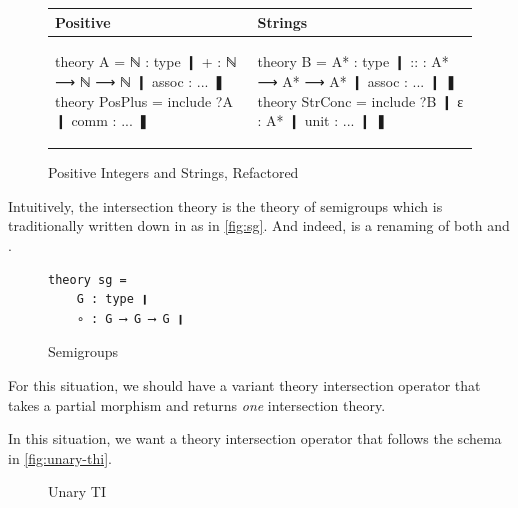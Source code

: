 \begin{figure}[ht]\centering
\begin{tabular}{|p{6cm}|p{6cm}|}\hline
  Positive& Strings \\[-2pt]\hline
\begin{mmtcode}[aboveskip=-2pt,belowskip=-2pt]
theory A =
    ℕ : type ❙
    + : ℕ ⟶ ℕ ⟶ ℕ ❙
    assoc : ... 
❚
theory PosPlus =
    include ?A ❙
    comm : ...
❚
\end{mmtcode}
& 
\begin{mmtcode}[aboveskip=-2pt,belowskip=-2pt]
theory B =
    A* : type ❙
    :: : A* ⟶ A* ⟶ A* ❙
    assoc : ... ❙
❚
theory StrConc =
    include ?B ❙
    ε : A* ❙
    unit : ... ❙
❚
\end{mmtcode}
\\[-2pt]\hline
\end{tabular}
\caption{Positive Integers and Strings, Refactored}\label{fig:posstr-intersection}\vspace*{-1.5em}
\end{figure}

Intuitively, the intersection theory is the theory of semigroups which is traditionally
written down in \mmt as in \autoref{fig:sg}. And indeed,  is a
renaming of both  and . 

\begin{figure}[ht]%
\centering
\begin{lstlisting}
theory sg =
    G : type ❙
    ∘ : G ⟶ G ⟶ G ❙
\end{lstlisting}%
\caption{Semigroups}\label{fig:sg}%
\end{figure}

For this situation, we should have a variant theory
intersection operator that takes a partial morphism and returns \emph{one} intersection theory.
   

In this situation, we want a theory intersection operator that follows the schema in \autoref{fig:unary-thi}. 

\begin{figure}[ht]%
\centering
{}%
\caption{Unary TI}\label{fig:unary-thi}%
\end{figure}

